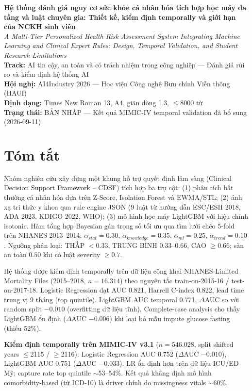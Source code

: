 \documentclass[13pt,a4paper]{article}
\newcommand{\doititle}{Hệ thống đánh giá nguy cơ sức khỏe cá nhân hóa tích hợp học máy đa tầng và luật chuyên gia: Thiết kế, kiểm định temporally và giới hạn của NCKH sinh viên}
\newcommand{\doititleen}{A Multi-Tier Personalized Health Risk Assessment System Integrating Machine Learning and Clinical Expert Rules: Design, Temporal Validation, and Student Research Limitations}
\begin{document}
\begin{center}
    {\LARGE \textbf{\doititle}} \\[0.5cm]
    {\large \textit{\doititleen}} \\[1.5cm]
    
    \textbf{Track:} AI tin cậy, an toàn và có trách nhiệm trong công nghiệp — Đánh giá rủi ro và kiểm định hệ thống AI \\
    \textbf{Hội nghị:} AI4Industry 2026 — Học viện Công nghệ Bưu chính Viễn thông (HAUI) \\
    \textbf{Định dạng:} Times New Roman 13, A4, giãn dòng 1.3, $\le$8000 từ \\
    \textbf{Trạng thái:} BẢN NHÁP — Kết quả MIMIC-IV temporal validation đã bổ sung (2026-09-11)
\end{center}

\vspace{1cm}

\section*{Tóm tắt}

Nhóm nghiên cứu xây dựng một khung hỗ trợ quyết định lâm sàng (Clinical Decision Support Framework -- CDSF) tích hợp ba trụ cột: (1) phân tích bất thường cá nhân hóa dựa trên Z-Score, Isolation Forest và EWMA/STL; (2) ánh xạ tri thức y khoa qua rule engine JSON (9 luật từ hướng dẫn ESC/ESH 2018, ADA 2023, KDIGO 2022, WHO); (3) mô hình học máy LightGBM với hiệu chỉnh isotonic. Hàm tổng hợp Bayesian gán trọng số tối ưu qua tìm lưới chéo 5-fold trên NHANES 2013--2014: $\alpha_{stat}=0.30$, $\alpha_{knowledge}=0.35$, $\alpha_{ml}=0.25$, $\alpha_{trend}=0.10$. Ngưỡng phân loại: THẤP $<0.33$, TRUNG BÌNH $0.33$--$0.66$, CAO $\ge0.66$; sàn an toàn $0.50$ khi có luật severity $\ge0.7$.

Hệ thống được kiểm định temporally trên dữ liệu công khai NHANES-Limited Mortality Files (2015--2018, $n=16.314$) theo nguyên tắc train-on-2015-16 / test-on-2017-18. Logistic Regression đạt AUC 0.821, Harrell C-index 0.822, lead time trung vị 9 tháng (top quintile). LightGBM AUC temporal 0.771, $\Delta$AUC so với random split $-0.010$ (overfitting dữ liệu tĩnh). Complete-case analysis cho thấy LightGBM ổn định ($\Delta$AUC $-0.006$) khi loại bỏ mẫu impute glucose fasting (thiếu 52\%).

\textbf{Kiểm định temporally trên MIMIC-IV v3.1} ($n=546.028$, split shifted years $\le$2115 / $\ge$2116): Logistic Regression AUC 0.752 ($\Delta$AUC $-0.010$), LightGBM AUC 0.751 ($\Delta$AUC $-0.033$). LR ổn định hơn trên dữ liệu ICU/ED Mỹ; capture rate top quintile $\sim$53--54\%. Kết quả khẳng định mô hình comorbidity-based (từ ICD-10) là driver chính do missingness vitals $\sim$60\%.
\end{document}

